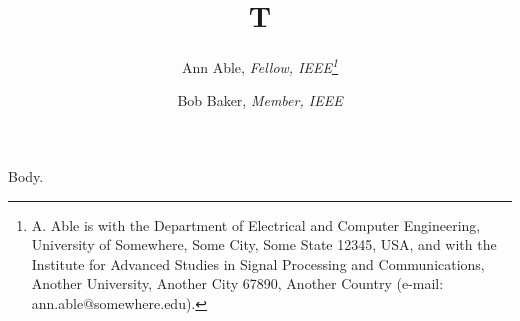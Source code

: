 \documentclass{article}
\begin{document}
\title{T}
\author{Ann Able, {\itshape Fellow, IEEE\thanks{A. Able is with the Department of Electrical and Computer Engineering, University of Somewhere, Some City, Some State 12345, USA, and with the Institute for Advanced Studies in Signal Processing and Communications, Another University, Another City 67890, Another Country (e-mail: ann.able@somewhere.edu).}}
\and Bob Baker, {\itshape Member, IEEE}}
\maketitle
Body.
\end{document}

